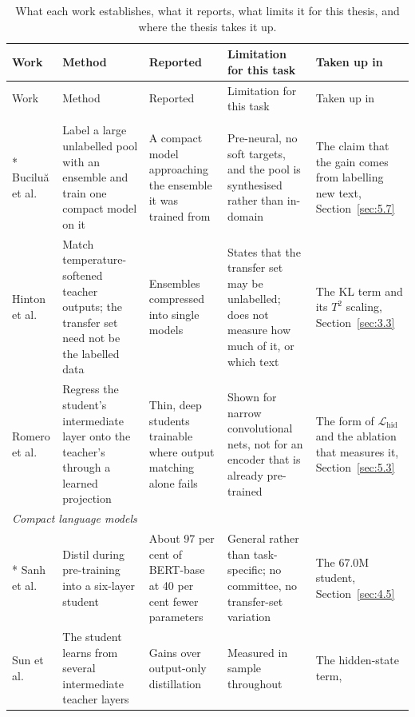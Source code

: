 \begin{center}
{\footnotesize
\setlength{\tabcolsep}{3pt}
\begin{longtable}{p{2.35cm}p{3.2cm}p{2.4cm}p{3.0cm}p{2.4cm}}
\caption[What the literature establishes and what it leaves open]{What each work establishes, what it
reports, what limits it for this thesis, and where the thesis takes it up.}
\label{tab:gap}\\
\toprule
Work & Method & Reported & Limitation for this task & Taken up in \\
\midrule
\endfirsthead
\toprule
Work & Method & Reported & Limitation for this task & Taken up in \\
\midrule
\endhead
\bottomrule
\endfoot
\multicolumn{5}{l}{\emph{Foundations}} \\*
Buciluă et al.\ \cite{bucilua2006model} & Label a large unlabelled pool with an ensemble and train one
compact model on it & A compact model approaching the ensemble it was trained from & Pre-neural, no soft
targets, and the pool is synthesised rather than in-domain & The claim that the gain comes from
labelling new text, Section~\ref{sec:5.7} \\
Hinton et al.\ \cite{hinton2015distilling} & Match temperature-softened teacher outputs; the transfer
set need not be the labelled data & Ensembles compressed into single models & States that the transfer
set may be unlabelled; does not measure how much of it, or which text & The KL term and its $T^2$
scaling, Section~\ref{sec:3.3} \\
Romero et al.\ \cite{romero2015fitnets} & Regress the student's intermediate layer onto the teacher's
through a learned projection & Thin, deep students trainable where output matching alone fails & Shown
for narrow convolutional nets, not for an encoder that is already pre-trained & The form of
$\mathcal{L}_{\mathrm{hid}}$ and the ablation that measures it, Section~\ref{sec:5.3} \\
\midrule
\multicolumn{5}{l}{\emph{Compact language models}} \\*
Sanh et al.\ \cite{sanh2019distilbert} & Distil during pre-training into a six-layer student & About 97
per cent of BERT-base at 40 per cent fewer parameters & General rather than task-specific; no committee,
no transfer-set variation & The 67.0M student, Section~\ref{sec:4.5} \\
Sun et al.\ \cite{sun2019patient} & The student learns from several intermediate teacher layers & Gains
over output-only distillation & Measured in sample throughout & The hidden-state term,

\end{longtable}}
\end{center}
